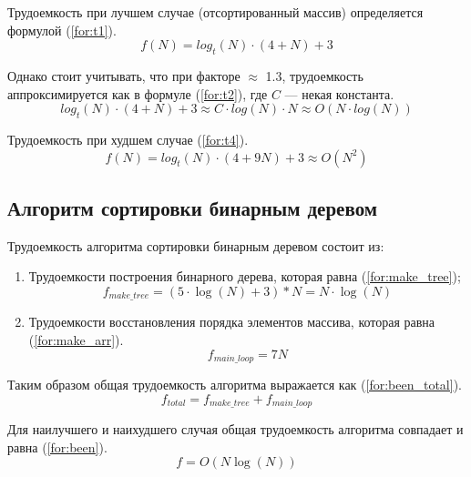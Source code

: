 Трудоемкость при лучшем случае (отсортированный массив) определяется формулой (\ref{for:t1}).
\begin{equation}
	\label{for:t1}
	f(N) = log_t(N) \cdot (4 + N) + 3
\end{equation}

Однако стоит учитывать, что при факторе $\approx$ 1.3, трудоемкость аппроксимируется как в формуле (\ref{for:t2}), где $C$ --- некая константа. 
\begin{equation}
	\label{for:t2}
	log_t(N) \cdot (4 + N) + 3 \approx C \cdot log(N) \cdot N \approx O(N \cdot log(N))
\end{equation}

Трудоемкость при худшем случае (\ref{for:t4}).
\begin{equation}
	\label{for:t4}
	f(N) =log_t(N) \cdot (4 + 9N) + 3 \approx O(N^2)
\end{equation}

\subsection{Алгоритм сортировки бинарным деревом}

Трудоемкость алгоритма сортировки бинарным деревом состоит из:
\begin{enumerate}
	\item Трудоемкости построения бинарного дерева, которая равна (\ref{for:make_tree});
	\begin{equation}
		\label{for:make_tree}
		f_{make\_tree} = (5 \cdot \log(N) + 3) * N = N \cdot \log(N)
	\end{equation}
	\item Трудоемкости восстановления порядка элементов массива, которая равна (\ref{for:make_arr}).
	\begin{equation}
		\label{for:make_arr}
		f_{main\_loop} = 7 N
	\end{equation}
\end{enumerate}

Таким образом общая трудоемкость алгоритма выражается как (\ref{for:been_total}).
\begin{equation}
	\label{for:been_total}
	f_{total} = f_{make\_tree} + f_{main\_loop}
\end{equation}


Для наилучшего и наихудшего случая общая трудоемкость алгоритма совпадает и равна (\ref{for:been}).
\begin{equation}
	\label{for:been}
	f = O(N\log(N))
\end{equation}



